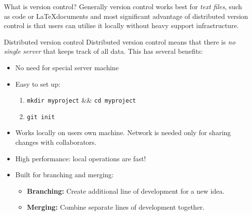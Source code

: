 \documentclass[final,hyperref={pdfpagelabels=false},notitlepage=true]{beamer}
\begin{document}
\begin{frame}{}
\begin{columns}[t]
\begin{column}{0.45\linewidth}
\begin{block}{\large What is version control?}
\vpace{1cm}
      Generally version control works best for \emph{text files}, such
      as code or \LaTeX documents and
most significant advantage of distributed version control is that 
users can utilise it locally without heavy support infrastructure.

    \end{block}

\vpace{1cm}
    \begin{block}{\large Distributed version control}
      Distributed version control means that there is \emph{no single server}
      that keeps track of all data. This has several benefits:
      \begin{itemize}
        \item No need for special server machine
        \item Easy to set up:
          \begin{enumerate}
            \item {\tt mkdir myproject} \&\& {\tt cd myproject}
            \item {\tt git init}
          \end{enumerate}
        \item Works locally on users own machine. Network is needed
          only for sharing changes with collaborators.
        \item High performance: local operations are fast!
        \item Built for branching and merging:
          \begin{itemize}
            \item {\bf Branching:} Create additional line of
              development for a new idea.
            \item {\bf Merging:} Combine separate lines of development
              together.
          \end{itemize}
      \end{itemize}
    \end{block}


\end{column}
\end{columns}
\end{frame}
\end{document}
